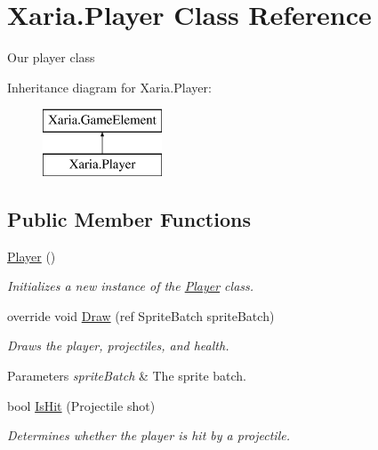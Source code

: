 \hypertarget{classXaria_1_1Player}{}\section{Xaria.\+Player Class Reference}
\label{classXaria_1_1Player}


Our player class  


Inheritance diagram for Xaria.\+Player\+:\begin{figure}[H]
\begin{center}
\leavevmode
\includegraphics[height=2.000000cm]{classXaria_1_1Player}
\end{center}
\end{figure}
\subsection*{Public Member Functions}
\begin{DoxyCompactItemize}
\item 
\hyperlink{classXaria_1_1Player_a86d80bfee5af015e8612cd992bf53ad0}{Player} ()
\begin{DoxyCompactList}\small\item\em Initializes a new instance of the \hyperlink{classXaria_1_1Player}{Player} class. \end{DoxyCompactList}\item 
override void \hyperlink{classXaria_1_1Player_a25ddea2b9d8679ab6aa649fda6ce1f22}{Draw} (ref Sprite\+Batch sprite\+Batch)
\begin{DoxyCompactList}\small\item\em Draws the player, projectiles, and health. 
\begin{DoxyParams}{Parameters}
{\em sprite\+Batch} & The sprite batch.\\
\hline
\end{DoxyParams}
\end{DoxyCompactList}\item 
bool \hyperlink{classXaria_1_1Player_a75f034f442c2afb88d445ea6968c9a1d}{Is\+Hit} (Projectile shot)
\begin{DoxyCompactList}\small\item\em Determines whether the player is hit by a projectile. \end{DoxyCompactList}\end{DoxyCompactItemize}
